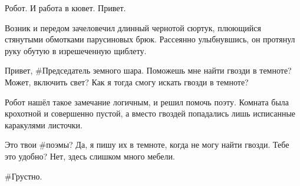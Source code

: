 \begin{dialog}
\X Робот. И работа в кювет. Привет.
\end{dialog}

\begin{monolog}
Возник и передом зачеловечил длинный чернотой сюртук, плюющийся стянутыми обмотками парусиновых брюк. Рассеянно улыбнувшись, он протянул руку обутую в изрешеченную щиблету.
\end{monolog}

\begin{dialog}
\R Привет, \#Председатель земного шара.
\X Поможешь мне найти гвозди в темноте?
\R Может, включить свет?
\X Как я тогда смогу искать гвозди в темноте?
\end{dialog}

\begin{monolog}
Робот нашёл такое замечание логичным, и решил помочь поэту. Комната была крохотной и совершенно пустой, а вместо гвоздей попадались лишь исписанные каракулями листочки.
\end{monolog}

\begin{dialog}
\R Это твои \#поэмы?
\X Да, я пишу их в темноте, когда не могу найти гвозди.
\R Тебе это удобно?
\X Нет, здесь слишком много мебели.
\end{dialog}

\begin{dialog}
\R \#Грустно.
\end{dialog}